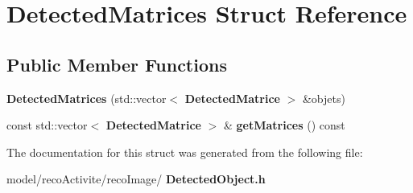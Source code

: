 \section{Detected\+Matrices Struct Reference}
\label{struct_detected_matrices}
\subsection*{Public Member Functions}
\begin{DoxyCompactItemize}
\item 
\mbox{\label{struct_detected_matrices_ab144467e2fdba2b97d35e3cc467354eb}} 
{\bfseries Detected\+Matrices} (std\+::vector$<$ \textbf{ Detected\+Matrice} $>$ \&objets)
\item 
\mbox{\label{struct_detected_matrices_a92729e0ed87c40a65d545f85a454ddcb}} 
const std\+::vector$<$ \textbf{ Detected\+Matrice} $>$ \& {\bfseries get\+Matrices} () const
\end{DoxyCompactItemize}


The documentation for this struct was generated from the following file\+:\begin{DoxyCompactItemize}
\item 
model/reco\+Activite/reco\+Image/\textbf{ Detected\+Object.\+h}\end{DoxyCompactItemize}
